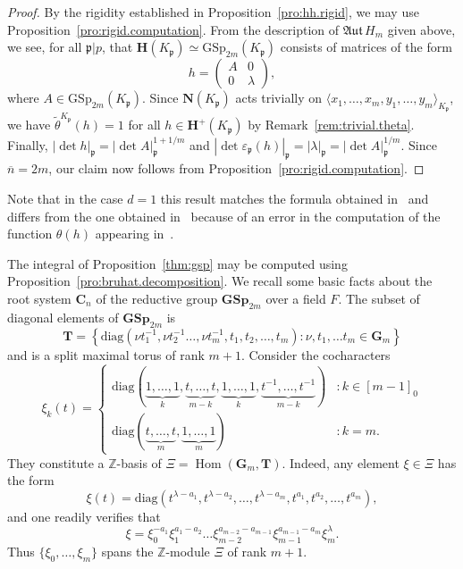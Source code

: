 \documentclass[11pt,a4paper]{amsart}
\theoremstyle{plain}
\theoremstyle{remark}
\newcommand{\Z}{\mathbb{Z}}
\newcommand{\p}{\mathfrak{p}}
\newcommand{\overdim}{\overline{n}}
\DeclareMathOperator{\Hom}{Hom}
\def \aAut {\mathfrak{Aut} \,}
\def \p {\ensuremath{\mathfrak{p}}}
\begin{document}
\begin{proof}
By the rigidity established in Proposition~\ref{pro:hh.rigid}, we may use Proposition~\ref{pro:rigid.computation}.  From the description of $\aAut H_m$ given above, we see, for all $\p | p$, that $\mathbf{H}(K_\p) \simeq \mathrm{GSp}_{2m}(K_\p)$ consists of matrices of the form
$$
h = \left( \begin{array}{cc} A & 0 \\ 0 & \lambda \end{array} \right),$$
where $A \in \mathrm{GSp}_{2m}(K_\p)$.  Since $\mathbf{N}(K_\p)$ acts trivially on $\langle x_1, \dots, x_m, y_1, \dots, y_m \rangle_{K_\p}$, we have $\widetilde{\theta}^{K_\p}(h) = 1$ for all $h \in \mathbf{H}^+(K_\p)$ by Remark~\ref{rem:trivial.theta}.  Finally, $| \det h |_{\p} = | \det A |^{1 + 1/m}_{\p}$ and $| \det \varepsilon_\p(h) |_{\p} = | \lambda |_{\p} = | \det A |_{\p}^{1/m}$.  Since $\overdim = 2m$, our claim now follows from Proposition~\ref{pro:rigid.computation}.
\end{proof}

Note that in the case $d = 1$ this result matches the formula obtained in~\cite[Proposition 3.14]{Berman/05} and differs from the one obtained in~\cite[Lemma 3.14]{duSLubotzky/96} because of an error in the computation of the function $\theta(h)$ appearing in~\cite{duSLubotzky/96}.  

The integral of Proposition~\ref{thm:gsp} may be computed using Proposition~\ref{pro:bruhat.decomposition}.  We recall some basic facts about the root system $\mathbf{C}_n$ of the reductive group $\mathbf{GSp}_{2m}$ over a field $F$.  The subset of diagonal elements of $\mathbf{GSp}_{2m}$ is
$$\mathbf{T} = \left\{ \mathrm{diag} ( \nu t_1^{-1}, \nu t_2^{-1} \dots, \nu t_m^{-1}, t_1, t_2, \dots, t_m) : \nu, t_1, \dots t_m \in \mathbf{G}_m \right\} $$
and is a split maximal torus of rank $m+1$.  Consider the cocharacters
\begin{equation*}
\xi_k(t) = \begin{cases}
\mathrm{diag} (\underbrace{1, \dots, 1}_{k}, \underbrace{t, \dots, t}_{m - k}, \underbrace{1, \dots, 1}_k, \underbrace{t^{-1}, \dots, t^{-1}}_{m-k} ) &: k \in [m-1]_0 \\
\mathrm{diag} (\underbrace{t, \dots, t}_{m}, \underbrace{1, \dots, 1}_{m} ) &: k = m.
\end{cases}
\end{equation*}
They constitute a $\Z$-basis of $\Xi = \Hom(\mathbf{G}_m, \mathbf{T})$.  Indeed, any element $\xi \in \Xi$ has the form
\begin{equation} \label{equ:xiform}
\xi(t) = \mathrm{diag}(t^{\lambda - a_1}, t^{\lambda - a_2}, \dots, t^{\lambda - a_m}, t^{a_1}, t^{a_2}, \dots, t^{a_m} ),
\end{equation}
and one readily verifies that
\begin{equation} \label{equ:xibasis}
\xi = \xi_0^{-a_1} \xi_1^{a_1 - a_2} \dots \xi_{m-2}^{a_{m-2} - a_{m-1}} \xi_{m-1}^{a_{m-1} - a_{m}} \xi_m^{\lambda}.
\end{equation}
Thus $\{ \xi_0, \dots, \xi_m \}$ spans the $\Z$-module $\Xi$ of rank $m+1$.
\end{document}
